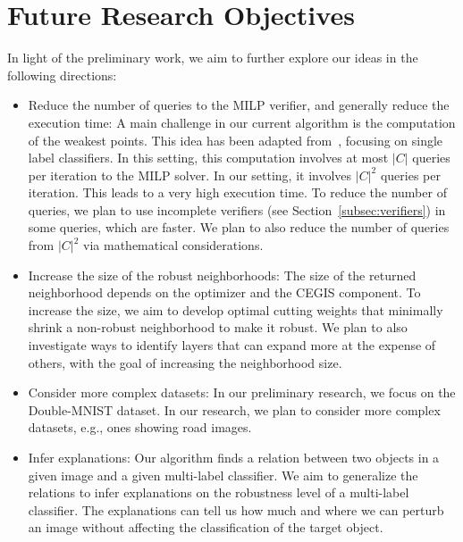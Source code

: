 

\section{Future Research Objectives}
In light of the preliminary work, we aim to further explore our ideas in the following directions:
\begin{itemize}
    \item Reduce the number of queries to the MILP verifier, and generally reduce the execution time:
    A main challenge in our current algorithm is the computation of the weakest points.
    This idea has been adapted from~\cite{MARVEL}, focusing on single label classifiers.
    In this setting, this computation involves at most $|C|$ queries per iteration to the MILP solver.
    In our setting, it involves  $|C|^2$ queries per iteration.
    This leads to a very high execution time.
    To reduce the number of queries, we plan to use incomplete verifiers (see Section~\ref{subsec:verifiers}) in some queries, 
    which are faster.
    We plan to also reduce the number of queries from $|C|^2$ via mathematical considerations.
    \item Increase the size of the robust neighborhoods: The size of the returned neighborhood depends on the optimizer and the CEGIS component.
    To increase the size, we aim to develop optimal cutting weights that minimally shrink a non-robust neighborhood to make it robust.
    We plan to also investigate ways to identify layers that can expand more at the expense of others, with the goal of increasing the neighborhood size.
\item Consider more complex datasets: In our preliminary research, we focus on the Double-MNIST dataset. In our research, we plan to consider more complex datasets, e.g., ones showing road images. 
    \item Infer explanations: Our algorithm finds a relation between two objects in a given image and a given multi-label classifier.
    We aim to generalize the relations to infer explanations on the robustness level of a multi-label classifier. The explanations can tell us how much and where we can perturb an image without affecting the classification of the target object. 
\end{itemize}

